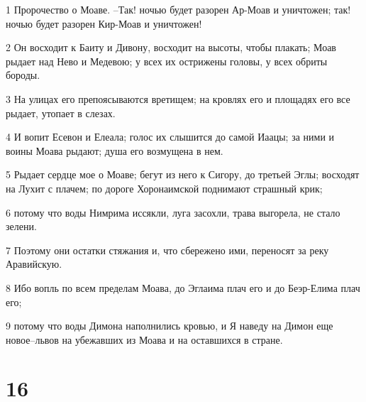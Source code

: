 \par 1 Пророчество о Моаве. --Так! ночью будет разорен Ар-Моав и уничтожен; так! ночью будет разорен Кир-Моав и уничтожен!
\par 2 Он восходит к Баиту и Дивону, восходит на высоты, чтобы плакать; Моав рыдает над Нево и Медевою; у всех их острижены головы, у всех обриты бороды.
\par 3 На улицах его препоясываются вретищем; на кровлях его и площадях его все рыдает, утопает в слезах.
\par 4 И вопит Есевон и Елеала; голос их слышится до самой Иаацы; за ними и воины Моава рыдают; душа его возмущена в нем.
\par 5 Рыдает сердце мое о Моаве; бегут из него к Сигору, до третьей Эглы; восходят на Лухит с плачем; по дороге Хоронаимской поднимают страшный крик;
\par 6 потому что воды Нимрима иссякли, луга засохли, трава выгорела, не стало зелени.
\par 7 Поэтому они остатки стяжания и, что сбережено ими, переносят за реку Аравийскую.
\par 8 Ибо вопль по всем пределам Моава, до Эглаима плач его и до Беэр-Елима плач его;
\par 9 потому что воды Димона наполнились кровью, и Я наведу на Димон еще новое--львов на убежавших из Моава и на оставшихся в стране.

\chapter{16}

